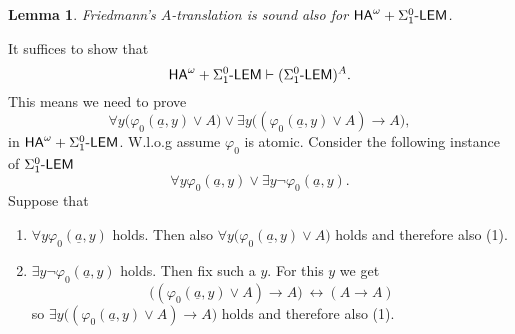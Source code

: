\documentclass[1p]{elsarticle}
\newcommand{\usftext}[1]{\textsf{\upshape #1}}
\newcommand{\ha}{\ensuremath{{\usftext{HA}}^\omega}} %
\newcommand{\IA}{\ensuremath{\usftext{IA}}} %
\newcommand{\LEM}{\ensuremath{\Sigma^0_1\usftext{-LEM}}}
\newcommand{\SiLm}{\ensuremath{\Sigma^0_1\usftext{-}}}
\newcommand{\tup}{\underline} %
\theoremstyle{plain}
\newtheorem{lemma}[thm]{Lemma}
\theoremstyle{definition}
\theoremstyle{remark}
\renewenvironment{proof}[1][]{\noindent{\bf Proof{#1}. }}{\nopagebreak[4]{\hspace*{\fill}
  $\Box$              %
 }{\vspace{2ex}}}
\renewcommand{\phi}{\varphi}
\theoremstyle{definition}
\begin{document}
{\begin{lemma}\label{l:Atrans+}
Friedmann's $A$-translation is sound also for $\ha + \LEM$.
\end{lemma}
\begin{proof}
It suffices to show that
\[\ha + \LEM\vdash (\LEM)^A.\]
This means we need to prove
\[ \forall y \big( \phi_0(\tup a,y) \vee A\big) \vee \exists y \big(  (\phi_0(\tup a,y) \vee A) \rightarrow A\big),\tag{1}\]
in $\ha + \LEM$. W.l.o.g assume $\phi_0$ is atomic. 
Consider the following instance of $\LEM$
\[\forall y \phi_0(\tup a,y)  \vee \exists y \neg\phi_0(\tup a,y).\]
Suppose that
\begin{enumerate}
\item $\forall y \phi_0(\tup a,y)$ holds. Then also $\forall y \big( \phi_0(\tup a,y) \vee A\big)$ holds and therefore also (1).
\item $\exists y \neg\phi_0(\tup a,y)$ holds. Then fix such a $y$. For this $y$ we get 
\[\big(  (\phi_0(\tup a,y) \vee A) \rightarrow A\big)\ \leftrightarrow (A\rightarrow A)\]
so $ \exists y \big(  (\phi_0(\tup a,y) \vee A) \rightarrow A\big)$ holds and therefore also (1).
\end{enumerate}
\end{proof}


}
\end{document}
